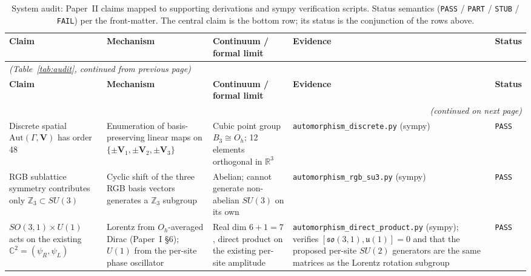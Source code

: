 {\scriptsize
\setlength{\tabcolsep}{4pt}
\renewcommand{\arraystretch}{0.95}
\begin{longtable}{@{}p{3.2cm}p{3.6cm}p{3.4cm}p{3.8cm}p{1.0cm}@{}}
\caption{\small System audit: Paper~II claims mapped to supporting
derivations and sympy verification scripts.  Status semantics
(\texttt{PASS} / \texttt{PART} / \texttt{STUB} / \texttt{FAIL}) per
the front-matter.  The central claim is the bottom row;
its status is the conjunction of the rows above.}
\label{tab:audit_caption} \\
\hline
\textbf{Claim} & \textbf{Mechanism} & \textbf{Continuum / formal limit} & \textbf{Evidence} & \textbf{Status} \\
\hline
\endfirsthead

\multicolumn{5}{l}{\textit{(Table~\ref{tab:audit}, continued from previous page)}} \\
\hline
\textbf{Claim} & \textbf{Mechanism} & \textbf{Continuum / formal limit} & \textbf{Evidence} & \textbf{Status} \\
\hline
\endhead

\hline
\multicolumn{5}{r}{\textit{(continued on next page)}} \\
\endfoot

\hline
\endlastfoot

Discrete spatial $\mathrm{Aut}(\Gamma, \mathbf{V})$ has order 48
    & Enumeration of basis-preserving linear maps on
      $\{\pm\mathbf{V}_1, \pm\mathbf{V}_2, \pm\mathbf{V}_3\}$
    & Cubic point group $B_3 \cong O_h$;
      12 elements orthogonal in $\mathbb{R}^3$
    & \nolinkurl{automorphism_discrete.py} (sympy)
    & \texttt{PASS} \\

RGB sublattice symmetry contributes only $\mathbb{Z}_3 \subset SU(3)$
    & Cyclic shift of the three RGB basis vectors generates a
      $\mathbb{Z}_3$ subgroup
    & Abelian; cannot generate non-abelian $SU(3)$ on its own
    & \nolinkurl{automorphism_rgb_su3.py} (sympy)
    & \texttt{PASS} \\

$SO(3,1) \times U(1)$ acts on the existing $\mathbb{C}^2 = (\psi_R, \psi_L)$
    & Lorentz from $O_h$-averaged Dirac (Paper~I §6); $U(1)$
      from the per-site phase oscillator
    & Real dim $6 + 1 = 7$, direct product on the existing
      per-site amplitude
    & \nolinkurl{automorphism_direct_product.py} (sympy);
      verifies $[\mathfrak{so}(3,1), \mathfrak{u}(1)] = 0$ and that
      the proposed per-site $SU(2)$ generators are the same matrices
      as the Lorentz rotation subgroup
    & \texttt{PASS} \\


\end{longtable}}
